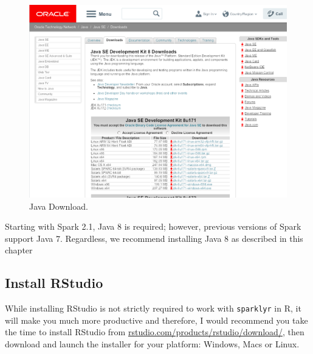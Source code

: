 \documentclass[]{book}
\theoremstyle{definition}
\theoremstyle{definition}
\theoremstyle{definition}
\theoremstyle{remark}
\begin{document}
\begin{figure}

{\centering \includegraphics[width=13.78in]{images/02-getting-started-jdk-8} 

}

\caption{Java Download.}\label{fig:java-download}
\end{figure}

Starting with Spark 2.1, Java 8 is required; however, previous versions
of Spark support Java 7. Regardless, we recommend installing Java 8 as
described in this chapter

\hypertarget{install-rstudio}{%
\subsection{Install RStudio}\label{install-rstudio}}

While installing RStudio is not strictly required to work with
\texttt{sparklyr} in R, it will make you much more productive and
therefore, I would recommend you take the time to install RStudio from
\href{https://www.rstudio.com/products/rstudio/download/}{rstudio.com/products/rstudio/download/},
then download and launch the installer for your platform: Windows, Macs
or Linux.
\end{document}
